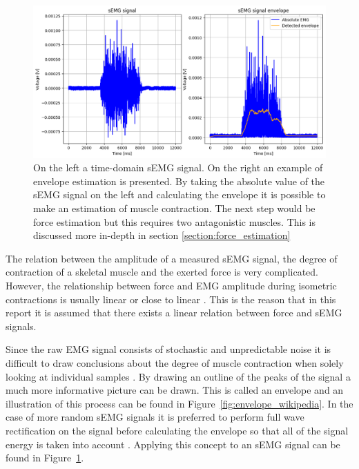 \begin{figure}[h!t]
	\begin{center}
		\includegraphics[width=1.0\columnwidth]{images/amplitude_force_estimation_example.png}
	\end{center}
	\caption{On the left a time-domain sEMG signal. On the right an example of envelope estimation is presented. By taking the absolute value of the sEMG signal on the left and calculating the envelope it is possible to make an estimation of muscle contraction. The next step would be force estimation but this requires two antagonistic muscles. This is discussed more in-depth in section \ref{section:force_estimation}}
	\label{fig:amplitude_estimation_example}
\end{figure}

The relation between the amplitude of a measured sEMG signal, the degree of contraction of a skeletal muscle and the exerted force is very complicated. However, the relationship between force and EMG amplitude during isometric contractions is usually linear or close to linear  \cite{interpreting_muscle_function_from_emg} \cite{adaptive_filter_dry_electrode}. This is the reason that in this report it is assumed that there exists a linear relation between force and sEMG signals.

Since the raw EMG signal consists of stochastic and unpredictable noise it is difficult to draw conclusions about the degree of muscle contraction when solely looking at individual samples \cite{semg_signals_analysis_and_applications}. By drawing an outline of the peaks of the signal a much more informative picture can be drawn. This is called an envelope and an illustration of this process can be found in Figure~\ref{fig:envelope_wikipedia}. In the case of more random sEMG signals it is preferred to perform full wave rectification on the signal before calculating the envelope so that all of the signal energy is taken into account \cite{semg_signals_analysis_and_applications}. Applying this concept to an sEMG signal can be found in Figure~\ref{fig:amplitude_estimation_example}.

